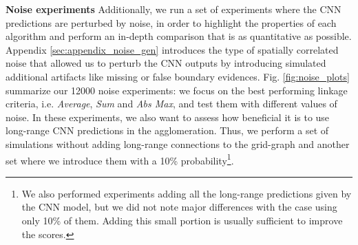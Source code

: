 

\textbf{Noise experiments }  Additionally, we run a set of experiments where the CNN predictions are perturbed by noise, in order to highlight the properties of each \algname{} algorithm and perform an in-depth comparison that is as quantitative as possible. Appendix \ref{sec:appendix_noise_gen} introduces the type of spatially correlated noise that allowed us to perturb the CNN outputs by introducing simulated additional artifacts like missing or false boundary evidences.  
Fig. \ref{fig:noise_plots} summarize our 12000 noise experiments: we focus on the best performing linkage criteria, i.e. \emph{Average}, \emph{Sum} and \emph{Abs Max}, and test them with different values of noise. 
In these experiments, we also want to assess how beneficial it is to use long-range CNN predictions in the agglomeration. Thus, we perform a set of simulations without adding long-range connections to the grid-graph and another set where we introduce them with a 10\% probability\footnote{We also performed experiments adding all the long-range predictions given by the CNN model, but we did not note major differences with the case using only 10\% of them. Adding this small portion is usually sufficient to improve the scores.}.

